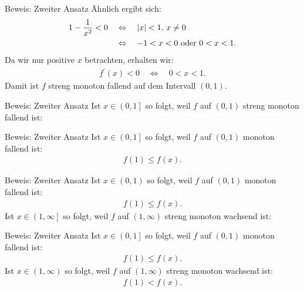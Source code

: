 \documentclass[10pt]{beamer}
\begin{document}
\begin{frame}{Beweis: Zweiter Ansatz}
    Ähnlich ergibt sich: 
    \begin{align*}
        1 - \frac{1}{x^{2}} < 0
        \quad & \Leftrightarrow \quad \text{\( \left\vert x \right\vert < 1 \), \( x \neq 0 \)} \\
        \quad & \Leftrightarrow \quad \text{\( -1 < x < 0 \) oder \( 0 < x < 1 \)}.
    \end{align*}
    Da wir nur positive \( x \) betrachten, erhalten wir:
    \begin{align*}
        f^{\prime}( x ) < 0 \quad \Leftrightarrow \quad 0 < x < 1.
    \end{align*}
    Damit ist \( f \) streng monoton fallend auf dem Intervall \( \left( 0, 1 \right) \).
\end{frame}



\begin{frame}{Beweis: Zweiter Ansatz}
    Ist \( x \in \left( 0, 1 \right] \) so folgt, weil \( f \) auf \( \left( 0, 1 \right) \) streng monoton fallend ist:
\end{frame}



\begin{frame}{Beweis: Zweiter Ansatz}
    Ist \( x \in \left( 0, 1 \right] \) so folgt, weil \( f \) auf \( \left( 0, 1 \right) \) monoton fallend ist:
    \begin{align*}
        f( 1 )
        \leq f( x ).
    \end{align*}
\end{frame}



\begin{frame}{Beweis: Zweiter Ansatz}
    Ist \( x \in \left( 0, 1 \right) \) so folgt, weil \( f \) auf \( \left( 0, 1 \right) \) monoton fallend ist:
    \begin{align*}
        f( 1 )
        \leq f( x ).
    \end{align*}
    Ist \( x \in \left( 1, \infty \right] \) so folgt, weil \( f \) auf \( \left( 1, \infty \right) \) streng monoton wachsend ist:
\end{frame}



\begin{frame}{Beweis: Zweiter Ansatz}
    Ist \( x \in \left( 0, 1 \right] \) so folgt, weil \( f \) auf \( \left( 0, 1 \right) \) monoton fallend ist:
    \begin{align*}
        f( 1 )
        \leq f( x ).
    \end{align*}
    Ist \( x \in \left( 1, \infty \right) \) so folgt, weil \( f \) auf \( \left( 1, \infty \right) \) streng monoton wachsend ist:
    \begin{align*}
        f( 1 )
        < f( x ).
    \end{align*}
\end{frame}
\end{document}
